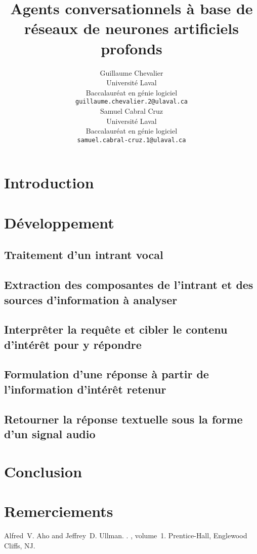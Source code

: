 \documentclass[11pt]{article}
\title{Agents conversationnels à base de réseaux de neurones artificiels profonds}
\author{Guillaume Chevalier \\
  Université Laval \\ Baccalauréat en génie logiciel \\
  {\tt \small guillaume.chevalier.2@ulaval.ca} \\\And
  Samuel Cabral Cruz \\
  Université Laval \\ Baccalauréat en génie logiciel \\
  {\tt \small samuel.cabral-cruz.1@ulaval.ca} \\}
\date{}
\begin{document}
\maketitle

\begin{abstract}

\end{abstract}

\section{Introduction}


\section{Développement}
\subsection{Traitement d'un intrant vocal}

\subsection{Extraction des composantes de l'intrant et des sources d'information à analyser}

\subsection{Interprêter la requête et cibler le contenu d'intérêt pour y répondre}

\subsection{Formulation d'une réponse à partir de l'information d'intérêt retenur}

\subsection{Retourner la réponse textuelle sous la forme d'un signal audio}

\section*{Conclusion}

\section*{Remerciements}

%
%

\begin{thebibliography}{}
Alfred~V. Aho and Jeffrey~D. Ullman.
.
, volume~1.
\newblock Prentice-{Hall}, Englewood Cliffs, NJ.

\end{thebibliography}
\end{document}
